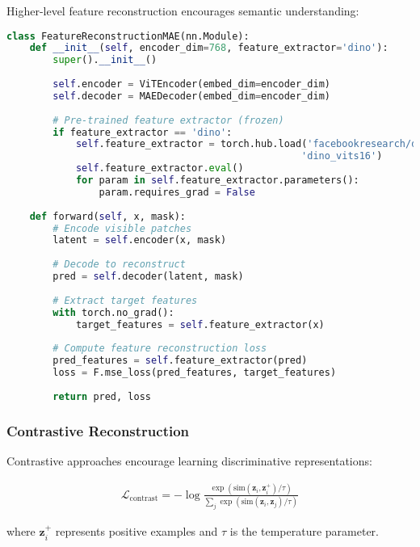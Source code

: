 Higher-level feature reconstruction encourages semantic understanding:

\begin{lstlisting}[language=Python, caption=Feature-level reconstruction using pre-trained encoders]
class FeatureReconstructionMAE(nn.Module):
    def __init__(self, encoder_dim=768, feature_extractor='dino'):
        super().__init__()
        
        self.encoder = ViTEncoder(embed_dim=encoder_dim)
        self.decoder = MAEDecoder(embed_dim=encoder_dim)
        
        # Pre-trained feature extractor (frozen)
        if feature_extractor == 'dino':
            self.feature_extractor = torch.hub.load('facebookresearch/dino:main', 
                                                   'dino_vits16')
            self.feature_extractor.eval()
            for param in self.feature_extractor.parameters():
                param.requires_grad = False
    
    def forward(self, x, mask):
        # Encode visible patches
        latent = self.encoder(x, mask)
        
        # Decode to reconstruct
        pred = self.decoder(latent, mask)
        
        # Extract target features
        with torch.no_grad():
            target_features = self.feature_extractor(x)
        
        # Compute feature reconstruction loss
        pred_features = self.feature_extractor(pred)
        loss = F.mse_loss(pred_features, target_features)
        
        return pred, loss
\end{lstlisting}

\subsubsection{Contrastive Reconstruction}

Contrastive approaches encourage learning discriminative representations:

\begin{align}
\mathcal{L}_{\text{contrast}} = -\log \frac{\exp(\text{sim}(\mathbf{z}_i, \mathbf{z}_i^+) / \tau)}{\sum_{j} \exp(\text{sim}(\mathbf{z}_i, \mathbf{z}_j) / \tau)}
\end{align}

where $\mathbf{z}_i^+$ represents positive examples and $\tau$ is the temperature parameter.

